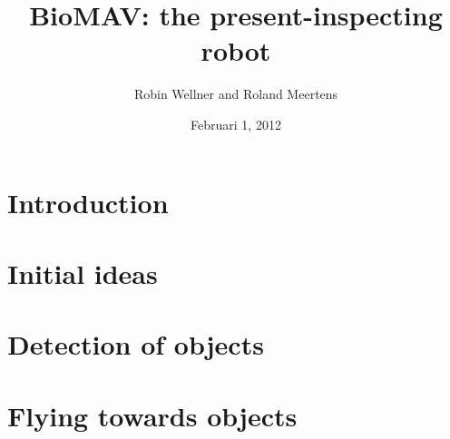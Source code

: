 \documentclass[a4paper,10pt]{article}
\begin{document}
\title{BioMAV: the present-inspecting robot}

\author{Robin Wellner and Roland Meertens}

\date{Februari 1, 2012}

\maketitle

\section{Introduction}


\section{Initial ideas}


\section{Detection of objects}

\section{Flying towards objects}




\end{document}
